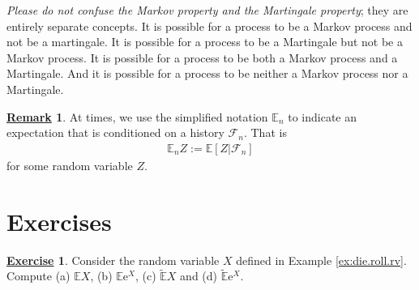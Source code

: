 \documentclass[12pt]{book}
\numberwithin{equation}{chapter}
\theoremstyle{plain}
\numberwithin{theorem}{section}
\theoremstyle{definition}
\newtheorem{remark}[theorem]{\underline{Remark}}
\newtheorem{exercise}{\underline{Exercise}}
\numberwithin{exercise}{chapter}
\newcommand{\<}{\langle}
\renewcommand{\>}{\rangle}
\renewcommand{\(}{\left(}
\renewcommand{\)}{\right)}
\renewcommand{\[}{\left[}
\renewcommand{\]}{\right]}
\newcommand\Eb{\mathds{E}}
\newcommand\Fc{\mathscr{F}}
\newcommand\Ebt{\widetilde{\Eb}}
\newcommand\ee{\mathrm{e}}
\theoremstyle{definition}
\numberwithin{question}{section}
\begin{document}
\noindent
\textit{Please do not confuse the Markov property and the Martingale property}; they are entirely separate concepts.
It is possible for a process to be a Markov process and not be a martingale.
It is possible for a process to be a Martingale but not be a Markov process.
It is possible for a process to be both a Markov process and a Martingale.
And it is possible for a process to be neither a Markov process nor a Martingale.

\begin{remark}
At times, we use the simplified notation $\Eb_n$ to indicate an expectation that is conditioned on a history $\Fc_n$.  That is
\begin{align}
\Eb_n Z 
	:=	\Eb[ Z | \Fc_n ]
\end{align}
for some random variable $Z$.
\end{remark}


\section{Exercises}
\label{sec:exer-A}

\begin{exercise}
\label{exer:A-1}
Consider the random variable $X$ defined in Example \ref{ex:die.roll.rv}.  Compute (a) $\Eb X$, (b) $\Eb \ee^X$, (c) $\Ebt X$ and (d) $\Ebt \ee^X$.
\end{exercise}
\end{document}
